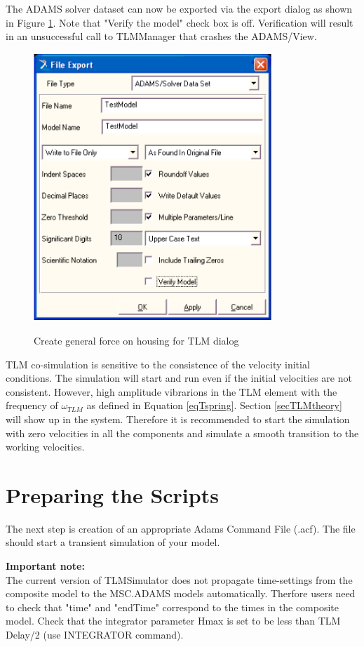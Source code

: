 The ADAMS solver dataset can now be exported via the export dialog as shown in Figure \ref{figADMExport}.
Note that "Verify the model" check box is off.
Verification will result in an unsuccessful call to TLMManager that crashes the ADAMS/View.

\begin{figure}[h]
\begin{center}
   {\includegraphics[width=9cm]{figs/TLMExportADM.png}}
\end{center}
\caption{Create general force on housing for TLM dialog \label{figADMExport}}
\end{figure}

TLM co-simulation is sensitive to the consistence of the velocity initial conditions. 
The simulation will start and run even if the initial velocities are not consistent.
However, high amplitude vibrarions in the TLM element with the frequency of $\omega_{TLM}$ as defined in Equation \ref{eqTspring}.
Section \ref{secTLMtheory} will show up in the system.
Therefore it is recommended to start the simulation with zero velocities in all the components and simulate a smooth transition to the working velocities.
\clearpage

\section{Preparing the Scripts}
\label{adams:startup-script}
The next step is creation of an appropriate Adams Command File (.acf).
The file should start a transient simulation of your model.

{\bf Important note:}\\ The current version of TLMSimulator does not propagate time-settings from the composite model to the MSC.ADAMS models automatically. 
Therfore users need to check that "time" and "endTime" correspond to the times in the composite model. 
Check that the integrator parameter Hmax is set to be less than TLM Delay/2 (use INTEGRATOR command).

